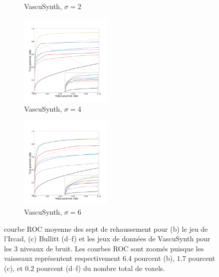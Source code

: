 \begin{figure}[!ht]
\begin{subfigure}[t]{0.4\textwidth}
  \caption{VascuSynth, $\sigma = 2$}
\end{subfigure}
  \begin{subfigure}[t]{0.4\textwidth}
  \includegraphics[clip = true, trim  =  125 125 100 200, width=44mm]{Images/Vascu_4_ROC.pdf}
  \caption{VascuSynth, $\sigma = 4$}
\end{subfigure}
  \begin{subfigure}[t]{0.4\textwidth}
    \includegraphics[clip = true, trim  =  125 125 100 200, width=44mm]{Images/Vascu_6_ROC.pdf}
    \caption{VascuSynth, $\sigma = 6$}
\end{subfigure}
  \caption{
    courbe ROC moyenne des sept de rehaussement pour (b) le jeu de l'Ircad,  (c) Bullitt (d--f) et les jeux de données de VascuSynth pour les 3 niveaux de bruit.
    Les courbes ROC sont zoomés puisque les vaisseaux représentent respectivement $6.4$ pourcent (b), $1.7$ pourcent (c), et $0.2$ pourcent (d--f) du nombre total de voxels.
    }
  \label{fig:Ircad_vascu_bullitt_ROC}
\end{figure}


